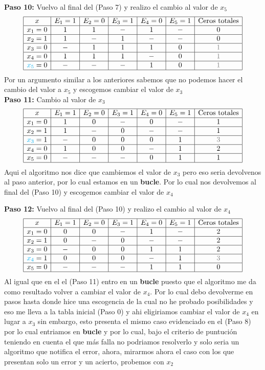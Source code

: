 \begin{sol}
\textbf{Paso 10:} Vuelvo al final del (Paso 7) y realizo el cambio al valor de $x_5$
$$
\begin{array}{|c|c|c|c|c|c|c|c|}
\hline
x & E_1=1 & E_2=0 & E_3=1 & E_4=0 & E_5=1 & \text{Ceros totales}\\
\hline
x_1= 0& 1 & 1& - & 1& - &0\\
\hline
x_2=1& 1&-& 1&- &-&0\\
\hline
x_3=0&-&1&1&1&0&\textcolor{gray}{1}\\
\hline
x_4=0& 1&1&1&-&0&\textcolor{gray}{1}\\
\hline
\textcolor{cyan}{x_5}=0&-&-&-&1&0&\textcolor{gray}{1}\\
\hline
\end{array}
$$
Por un argumento similar a los anteriores sabemos que no podemos hacer el cambio del valor a $x_5$ y escogemos cambiar el valor de $x_3$\\
\textbf{Paso 11:} Cambio al valor de $x_3$
$$
\begin{array}{|c|c|c|c|c|c|c|c|}
\hline
x & E_1=1 & E_2=0 & E_3=1 & E_4=0 & E_5=1 & \text{Ceros totales}\\
\hline
x_1= 0& 1 & 0& - & 0& - &1\\
\hline
x_2=1& 1&-& 0&- &-&1\\
\hline
\textcolor{cyan}{x_3}=1&-&0&0&0&1&\textcolor{gray}{3}\\
\hline
x_4=0& 1&0&0&-&1&2\\
\hline
x_5=0&-&-&-&0&1&1\\
\hline
\end{array}
$$
Aqui el algoritmo nos dice que cambiemos el valor de $x_3$ pero eso seria devolvenos al paso anterior, por lo cual estamos en un \textbf{bucle}. Por lo cual nos devolvemos al final del (Paso 10) y escogemos cambiar el valor de $x_4$

\textbf{Paso 12:} Vuelvo al final del (Paso 10) y realizo el cambio al valor de $x_4$
$$
\begin{array}{|c|c|c|c|c|c|c|c|}
\hline
x & E_1=1 & E_2=0 & E_3=1 & E_4=0 & E_5=1 & \text{Ceros totales}\\
\hline
x_1= 0& 0 & 0& - & 1& - &2\\
\hline
x_2=1& 0&-& 0&- &-&2\\
\hline
x_3=0&-&0&0&1&1&2\\
\hline
\textcolor{cyan}{x_4}=1& 0&0&0&-&1&\textcolor{gray}{3}\\
\hline
x_5=0&-&-&-&1&1&0\\
\hline
\end{array}
$$
Al igual que en el el (Paso 11) entro en un \textbf{bucle} puesto que el algoritmo me da como resultado volver a cambiar el valor de $x_4$.
Por lo cual debo devolverme en pasos hasta donde hice una escogencia de la cual no he probado posibilidades y eso me lleva a la tabla inicial (Paso 0) y ahi eligiriamos cambiar el valor de $x_4$ en lugar a $x_3$ sin embargo, esto presenta el mismo caso evidenciado en el (Paso 8) por lo cual entriamos en \textbf{bucle} y por lo cual, bajo el criterio de puntución teniendo en cuenta el que más falla no podriamos resolverlo y solo seria un algoritmo que notifica el error, ahora, mirarmos ahora el caso con los que presentan solo un error y un acierto, probemos con $x_2$



\end{sol}
